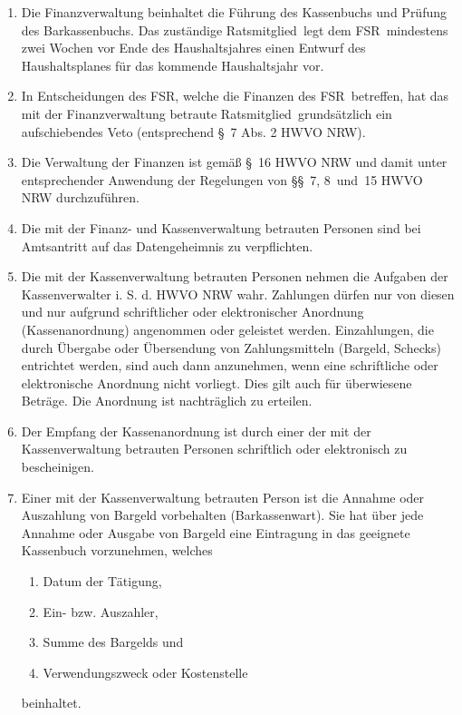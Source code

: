 \documentclass[a4paper, 12pt, ngerman]{article}
\newcommand{\rat}{FSR}
\newcommand{\rates}{FSR}
\newcommand{\mitglied}{Ratsmitglied}
\begin{document}
\begin{enumerate}[leftmargin=0cm]
	\begin{enumerate}[leftmargin=0cm]
		\item Die Finanzverwaltung beinhaltet die Führung des Kassenbuchs und Prüfung des Barkassenbuchs. Das zuständige \mitglied~legt dem \rat~mindestens zwei Wochen vor Ende des Haushaltsjahres einen Entwurf des Haushaltsplanes für das kommende Haushaltsjahr vor.
		\item In Entscheidungen des \rates, welche die Finanzen des \rates~betreffen, hat das mit der Finanzverwaltung betraute \mitglied~grundsätzlich ein aufschiebendes Veto (entsprechend §~7 Abs. 2 HWVO NRW).
		\item Die Verwaltung der Finanzen ist gemäß §~16 HWVO NRW und damit unter entsprechender Anwendung der Regelungen von §§~7, 8~und~15 HWVO NRW durchzuführen.
		\item Die mit der Finanz- und Kassenverwaltung betrauten Personen sind bei Amtsantritt auf das Datengeheimnis zu verpflichten.
        \item Die mit der Kassenverwaltung betrauten Personen nehmen die Aufgaben der Kassenverwalter i. S. d. HWVO NRW wahr. Zahlungen dürfen nur von diesen und nur aufgrund schriftlicher oder elektronischer Anordnung (Kassenanordnung) angenommen oder geleistet werden. Einzahlungen, die durch Übergabe oder Übersendung von Zahlungsmitteln (Bargeld, Schecks) entrichtet werden, sind auch dann anzunehmen, wenn eine schriftliche oder elektronische Anordnung nicht vorliegt. Dies gilt auch für überwiesene Beträge. Die Anordnung ist nachträglich zu erteilen.
        \item Der Empfang der Kassenanordnung ist durch einer der mit der Kassenverwaltung betrauten Personen schriftlich oder elektronisch zu bescheinigen.
        \item Einer mit der Kassenverwaltung betrauten Person ist die Annahme oder Auszahlung von Bargeld vorbehalten (Barkassenwart). Sie hat über jede Annahme oder Ausgabe von Bargeld eine Eintragung in das geeignete Kassenbuch vorzunehmen, welches
        \begin{enumerate}[leftmargin=0.5cm]
			\item Datum der Tätigung,
			\item Ein- bzw. Auszahler,
			\item Summe des Bargelds und
			\item Verwendungszweck oder Kostenstelle
		\end{enumerate}
        beinhaltet.
	\end{enumerate}	
	

\end{enumerate}
\end{document}

